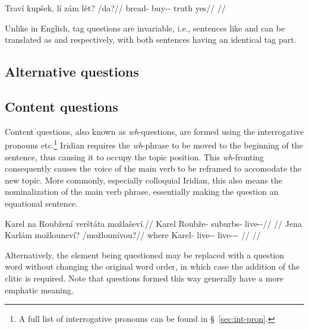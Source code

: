 \pex
\begingl
\gla Traví kupšek, lí zám lět? /da?//
\glb bread-\Gen{} buy-\Av{}-\Pf{} \Q{} \Neg{} truth yes//
\glft {}//
\endgl
\xe

Unlike in English, tag questions are invariable, i.e., sentences like
 and  can be translated as  and  respectively, with both sentences having an identical tag part.

\subsection{Alternative questions}\label{sec:alternative-questions}

\subsection{Content questions}\label{sec:content-questions}

Content questions, also known as \emph{wh}-questions, are formed using the
interrogative pronouns   
etc.\footnote{ A full list of interrogative pronouns can be found in
\S~\ref{sec:int-pron}. } Iridian requires the \emph{wh}-phrase to be moved to
the beginning of the sentence, thus causing it to occupy the topic position.
This \emph{wh}-fronting consequently
causes the voice of the main verb to be reframed to accomodate the new topic.
More commonly, especially colloquial Iridian, this
also means the nominalization of the main verb phrase,
essentially making the question an equational sentence.

\pex
\a\begingl
\gla Karel na Roubžení verštáta možlaševí.//
\glb Karel \Loc{} Roubže-\Gen{} suburbs-\Acc{} live-\Av{}-\Cont{}//
\glft {}//
\endgl
\a\begingl
\gla Jena Karlám možlouneví? /možlounívou?//
\glb where Karel-\Agt{} live-\Lv{}-\Cont{} live-\Lv{}-\Cont{}-\Nz{} //
\glft {}//
\endgl
\xe

Alternatively, the element being questioned may be replaced with a question word
without changing the original word order, in which case the addition of the
clitic  is required. Note that questions formed this way generally have
a more emphatic meaning.

